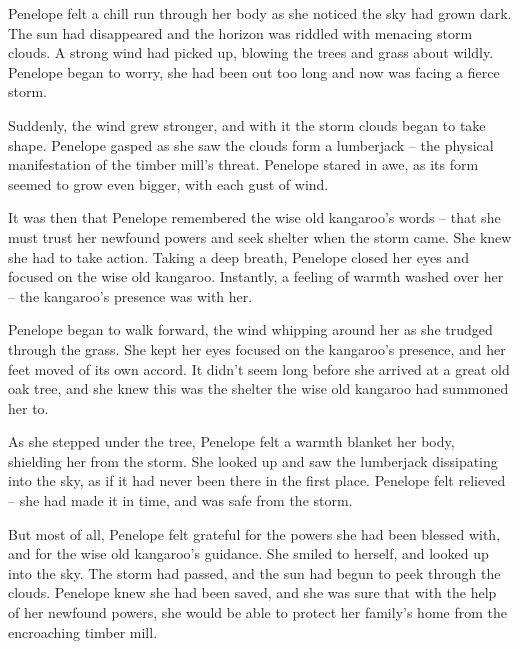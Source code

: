 

Penelope felt a chill run through her body as she noticed the sky had grown dark. The sun had disappeared and the horizon was riddled with menacing storm clouds. A strong wind had picked up, blowing the trees and grass about wildly. Penelope began to worry, she had been out too long and now was facing a fierce storm. 

Suddenly, the wind grew stronger, and with it the storm clouds began to take shape. Penelope gasped as she saw the clouds form a lumberjack – the physical manifestation of the timber mill's threat. Penelope stared in awe, as its form seemed to grow even bigger, with each gust of wind.

It was then that Penelope remembered the wise old kangaroo's words – that she must trust her newfound powers and seek shelter when the storm came. She knew she had to take action. Taking a deep breath, Penelope closed her eyes and focused on the wise old kangaroo. Instantly, a feeling of warmth washed over her – the kangaroo's presence was with her.

Penelope began to walk forward, the wind whipping around her as she trudged through the grass. She kept her eyes focused on the kangaroo's presence, and her feet moved of its own accord. It didn't seem long before she arrived at a great old oak tree, and she knew this was the shelter the wise old kangaroo had summoned her to.

As she stepped under the tree, Penelope felt a warmth blanket her body, shielding her from the storm. She looked up and saw the lumberjack dissipating into the sky, as if it had never been there in the first place. Penelope felt relieved – she had made it in time, and was safe from the storm.

But most of all, Penelope felt grateful for the powers she had been blessed with, and for the wise old kangaroo's guidance. She smiled to herself, and looked up into the sky. The storm had passed, and the sun had begun to peek through the clouds. Penelope knew she had been saved, and she was sure that with the help of her newfound powers, she would be able to protect her family's home from the encroaching timber mill.